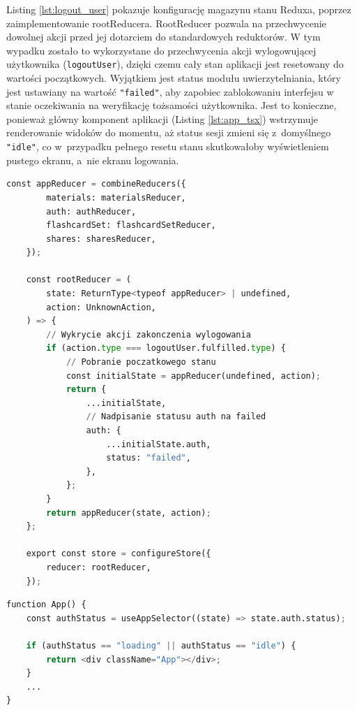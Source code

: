 Listing \ref{lst:logout_user} pokazuje konfigurację magazynu stanu Reduxa, poprzez zaimplementowanie rootReducera.
RootReducer pozwala na przechwycenie dowolnej akcji przed jej dotarciem do standardowych reduktorów. 
W tym wypadku zostało to wykorzystane do przechwycenia akcji wylogowującej użytkownika (\texttt{logoutUser}),
dzięki czemu cały stan aplikacji jest resetowany do wartości początkowych. Wyjątkiem jest status modułu 
uwierzytelniania, który jest ustawiany na wartość \texttt{"failed"}, aby zapobiec zablokowaniu interfejsu 
w stanie oczekiwania na weryfikację tożsamości użytkownika. Jest to konieczne, ponieważ główny komponent 
aplikacji (Listing \ref{lst:app_tsx}) wstrzymuje renderowanie widoków do momentu, aż status sesji 
zmieni się z~domyślnego \texttt{"idle"}, co w~przypadku pełnego resetu stanu skutkowałoby 
wyświetleniem pustego ekranu, a~nie ekranu logowania.

\begin{lstlisting}[language=Python,
	caption={Konfiguracja Redux z~mechanizmem resetowania stanu},
	label={lst:logout_user}]
    const appReducer = combineReducers({
        materials: materialsReducer,
        auth: authReducer,
        flashcardSet: flashcardSetReducer,
        shares: sharesReducer,
    });

    const rootReducer = (
        state: ReturnType<typeof appReducer> | undefined,
        action: UnknownAction,
    ) => {
        // Wykrycie akcji zakonczenia wylogowania
        if (action.type === logoutUser.fulfilled.type) {
            // Pobranie poczatkowego stanu 
            const initialState = appReducer(undefined, action);
            return {
                ...initialState,
                // Nadpisanie statusu auth na failed
                auth: {
                    ...initialState.auth,
                    status: "failed",
                },
            };
        }
        return appReducer(state, action);
    };

    export const store = configureStore({
        reducer: rootReducer,
    });
\end{lstlisting} 

\begin{lstlisting}[language=Python,
caption={Mechanizm blokady renderowania aplikacji do czasu ustalenia tożsamości użytkownika},
label={lst:app_tsx}]
function App() {
    const authStatus = useAppSelector((state) => state.auth.status);

    if (authStatus == "loading" || authStatus == "idle") {
        return <div className="App"></div>;
    }
    ...
}
\end{lstlisting}

